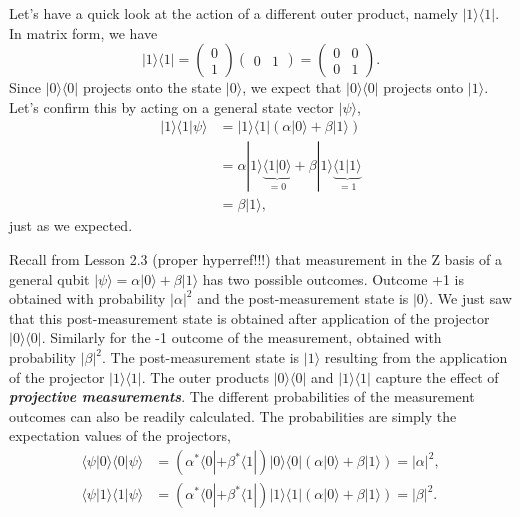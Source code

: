 Let's have a quick look at the action of a different outer product, namely $|1\rangle\langle1|$.
In matrix form, we have
\begin{equation}
    |1\rangle\langle1| = \begin{pmatrix} 0 \\ 1 \end{pmatrix} \begin{pmatrix} 0 & 1 \end{pmatrix} = \begin{pmatrix} 0 & 0  \\ 0 & 1 \end{pmatrix}.
\end{equation}
Since $|0\rangle\langle0|$ projects onto the state $|0\rangle$, we expect that $|0\rangle\langle0|$ projects onto $|1\rangle$.
Let's confirm this by acting on a general state vector $|\psi\rangle$,
\begin{align}
    |1\rangle\langle1|\psi\rangle & = |1\rangle\langle1| \left( \alpha|0\rangle + \beta|1\rangle \right) \label{eq:projector_11}\\
    & = \alpha |1\rangle\underbrace{\langle1|0\rangle}_{=0} + \beta |1\rangle\underbrace{\langle1|1\rangle}_{=1} \nonumber\\
    & = \beta|1\rangle, \nonumber
\end{align}
just as we expected.

Recall from Lesson 2.3 (proper hyperref!!!) that measurement in the Z basis of a general qubit $|\psi\rangle = \alpha |0\rangle + \beta |1\rangle$ has two possible outcomes.
Outcome +1 is obtained with probability $|\alpha|^2$ and the post-measurement state is $|0\rangle$.
We just saw that this post-measurement state is obtained after application of the projector $|0\rangle\langle0|$.
Similarly for the -1 outcome of the measurement, obtained with probability $|\beta|^2$.
The post-measurement state is $|1\rangle$ resulting from the application of the projector $|1\rangle\langle1|$.
The outer products $|0\rangle\langle0|$ and $|1\rangle\langle1|$ capture the effect of \textit{\textbf{projective measurements}}.
The different probabilities of the measurement outcomes can also be readily calculated.
The probabilities are simply the expectation values of the projectors,
\begin{align}
    \langle \psi | 0 \rangle \langle 0 | \psi \rangle & = \left( \alpha^*\langle0| + \beta^*\langle1| \right) |0\rangle\langle0| \left( \alpha |0\rangle + \beta |1\rangle \right) = |\alpha|^2, \\
    \langle \psi | 1 \rangle \langle 1 | \psi \rangle & = \left( \alpha^*\langle0| + \beta^*\langle1| \right) |1\rangle\langle1| \left( \alpha |0\rangle + \beta |1\rangle \right) = |\beta|^2.
\end{align}

